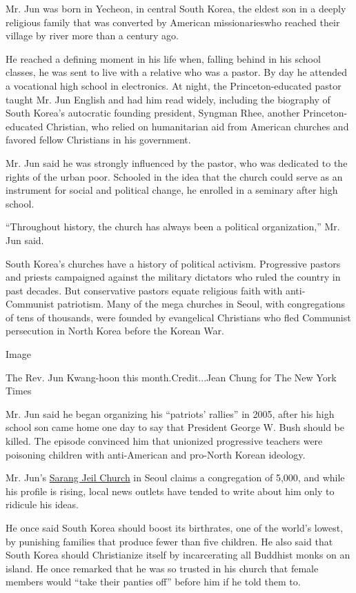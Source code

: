Mr. Jun​ was born in Yecheon, in central South Korea, the eldest son in
a deeply religious family that was converted ​by American missionaries
​who ​reached​ their village ​by river more than a century ago.

He reached a defining moment in his life when, falling behind in his
school classes, he was sent to live with a relative who was a pastor. By
day he attended a vocational high school in electronics. At night, the
Princeton-educated pastor taught Mr. Jun English and had him read
widely, including the biography of South Korea's autocratic founding
president, Syngman Rhee, another Princeton-educated Christian, who
relied on humanitarian aid from American churches and favored fellow
Christians in his government.

Mr. Jun said he was strongly influenced by the pastor, who was dedicated
to the rights of the urban poor. Schooled in the idea that the church
could serve as an instrument for social and political change, he
enrolled in a seminary after high school.

``Throughout history, the church has always been a political
organization,'' Mr. Jun said.

South Korea's churches have a history of political activism. Progressive
pastors and priests campaigned against the military dictators who ruled
the country in past decades. But conservative pastors equate religious
faith with anti-Communist patriotism. Many of the mega churches in
Seoul, with congregations of tens of thousands, were founded by
evangelical Christians who fled Communist persecution ​in North Korea
​​before the Korean War​.

Image

The Rev. Jun Kwang-hoon this month.Credit...Jean Chung for The New York
Times

Mr. Jun said he began organizing his ``patriots' rallies'' in 2005,
after his high school son came home one day to say that President George
W. Bush ​should be killed. The episode convinced him that unionized
progressive teachers were poisoning children with anti-American and
pro-North Korean ideology.

Mr. Jun's
\href{https://www.youtube.com/watch?v=FuhLN8-Uqjk\&list=UUQM0Zn_5zHh8zdGrfBbAekg\&index=12}{Sarang
Jeil Church} in Seoul claims a congregation of 5,000, and while his
profile is rising, local news outlets have tended to write about him
only to ridicule his ideas.

He once said South Korea should boost its birthrates, one of the world's
lowest, by punishing families that produce fewer than five children. He
also said that South Korea should Christianize itself by incarcerating
all Buddhist monks on an island. ​He once remarked that he was so
trusted in his church that female members ​would ``take their panties
off​''​ before him if he ​told them to.


